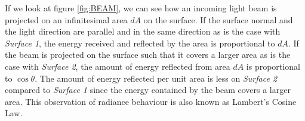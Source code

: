 If we look at figure \ref{fig:BEAM}, we can see how an incoming light beam is projected on an infinitesimal area $dA$ on the surface. If the surface normal and the light direction are parallel and in the same direction as is the case with {\it Surface 1}, the energy received and reflected by the area is proportional to $dA$. If the beam is projected on the surface such that it covers a larger area as is the case with {\it Surface 2}, the amount of energy reflected from area $dA$ is proportional to $\cos \theta$. The amount of energy reflected per unit area is less on {\it Surface 2} compared to {\it Surface 1} since the energy contained by the beam covers a larger area. This observation of radiance behaviour is also known as Lambert's Cosine Law. 


